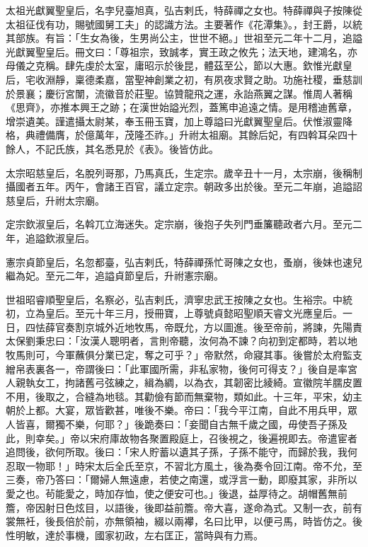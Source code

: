 
\begin{pinyinscope}

 太祖光獻翼聖皇后，名孛兒臺旭真，弘吉剌氏，特薛禪之女也。特薛禪與子按陳從太祖征伐有功，賜號國舅工夫」的認識方法。主要著作《花潭集》。，封王爵，以統其部族。有旨：「生女為後，生男尚公主，世世不絕。」世祖至元二年十二月，追謚光獻翼聖皇后。冊文曰：「尊祖宗，致誠孝，實王政之攸先；法天地，建鴻名，亦母儀之克稱。肆先虔於太室，庸昭示於後昆，體茲至公，節以大惠。欽惟光獻皇后，宅收淵靜，稟德柔嘉，當聖神創業之初，有夙夜求賢之助。功施社稷，垂慈訓於景襄；慶衍宮闈，流徽音於莊聖。協贊龍飛之運，永詒燕翼之謀。惟周人著稱《思齊》，亦推本興王之跡；在漢世始謚光烈，蓋篤申追遠之情。是用稽迪舊章，增崇遺美。謹遣攝太尉某，奉玉冊玉寶，加上尊謚曰光獻翼聖皇后。伏惟淑靈降格，典禮備膺，於億萬年，茂隆丕祚。」升祔太祖廟。其餘后妃，有四斡耳朵四十餘人，不記氏族，其名悉見於《表》。後皆仿此。



 太宗昭慈皇后，名脫列哥那，乃馬真氏，生定宗。歲辛丑十一月，太宗崩，後稱制攝國者五年。丙午，會諸王百官，議立定宗。朝政多出於後。至元二年崩，追謚詔慈皇后，升祔太宗廟。



 定宗欽淑皇后，名斡兀立海迷失。定宗崩，後抱子失列門垂簾聽政者六月。至元二年，追謚欽淑皇后。



 憲宗貞節皇后，名忽都臺，弘吉剌氏，特薛禪孫忙哥陳之女也，蚤崩，後妹也速兒繼為妃。至元二年，追謚貞節皇后，升祔憲宗廟。



 世祖昭睿順聖皇后，名察必，弘吉剌氏，濟寧忠武王按陳之女也。生裕宗。中統初，立為皇后。至元十年三月，授冊寶，上尊號貞懿昭聖順天睿文光應皇后。一日，四怯薛官奏割京城外近地牧馬，帝既允，方以圖進。後至帝前，將諫，先陽責太保劉秉忠曰：「汝漢人聰明者，言則帝聽，汝何為不諫？向初到定都時，若以地牧馬則可，今軍蘸俱分業已定，奪之可乎？」帝默然，命寢其事。後嘗於太府監支繒帛表裏各一，帝謂後曰：「此軍國所需，非私家物，後何可得支？」後自是率宮人親執女工，拘諸舊弓弦練之，緝為綢，以為衣，其韌密比綾綺。宣徽院羊臑皮置不用，後取之，合縫為地毯。其勸儉有節而無棄物，類如此。十三年，平宋，幼主朝於上都。大宴，眾皆歡甚，唯後不樂。帝曰：「我今平江南，自此不用兵甲，眾人皆喜，爾獨不樂，何耶？」後跪奏曰：「妾聞自古無千歲之國，毋使吾子孫及此，則幸矣。」帝以宋府庫故物各聚置殿庭上，召後視之，後遍視即去。帝遣宦者追問後，欲何所取。後曰：「宋人貯蓄以遺其子孫，子孫不能守，而歸於我，我何忍取一物耶！」時宋太后全氏至京，不習北方風土，後為奏令回江南。帝不允，至三奏，帝乃答曰：「爾婦人無遠慮，若使之南還，或浮言一動，即廢其家，非所以愛之也。茍能愛之，時加存恤，使之便安可也。」後退，益厚待之。胡帽舊無前簷，帝因射日色炫目，以語後，後即益前簷。帝大喜，遂命為式。又制一衣，前有裳無衽，後長倍於前，亦無領袖，綴以兩襻，名曰比甲，以便弓馬，時皆仿之。後性明敏，達於事機，國家初政，左右匡正，當時與有力焉。




\end{pinyinscope}
